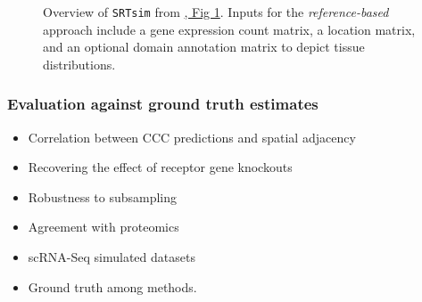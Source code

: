 \documentclass[
  letterpaper,
]{book}
\providecommand{\tightlist}{%
  \setlength{\itemsep}{0pt}\setlength{\parskip}{0pt}}\usepackage{longtable,booktabs,array}
\begin{document}
\begin{figure}


\caption{\label{fig-SRTsim}Overview of \texttt{SRTsim} from
\href{https://genomebiology.biomedcentral.com/articles/10.1186/s13059-023-02879-z/figures/1}{\textcite{zhu2023gb},
Fig 1}. Inputs for the \emph{reference-based} approach include a gene
expression count matrix, a location matrix, and an optional domain
annotation matrix to depict tissue distributions.}

\end{figure}%

\subsubsection{Evaluation against ground truth
estimates}\label{evaluation-against-ground-truth-estimates}

\begin{itemize}
\tightlist
\item
  Correlation between CCC predictions and spatial adjacency
\item
  Recovering the effect of receptor gene knockouts
\item
  Robustness to subsampling
\item
  Agreement with proteomics
\item
  scRNA-Seq simulated datasets
\item
  Ground truth among methods.
\end{itemize}
\end{document}
